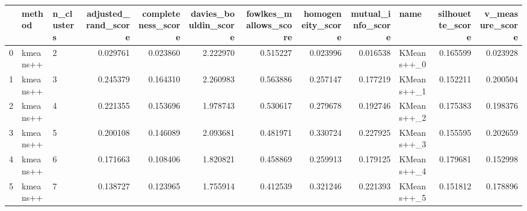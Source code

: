 \begin{tabular}{lllrrrrrrlrr}
\toprule
{} &    method & n\_clusters &  adjusted\_rand\_score &  completeness\_score &  davies\_bouldin\_score &  fowlkes\_mallows\_score &  homogeneity\_score &  mutual\_info\_score &        name &  silhouette\_score &  v\_measure\_score \\
\midrule
0 &  kmeans++ &          2 &             0.029761 &            0.023860 &              2.222970 &               0.515227 &           0.023996 &           0.016538 &  KMeans++\_0 &          0.165599 &         0.023928 \\
1 &  kmeans++ &          3 &             0.245379 &            0.164310 &              2.260983 &               0.563886 &           0.257147 &           0.177219 &  KMeans++\_1 &          0.152211 &         0.200504 \\
2 &  kmeans++ &          4 &             0.221355 &            0.153696 &              1.978743 &               0.530617 &           0.279678 &           0.192746 &  KMeans++\_2 &          0.175383 &         0.198376 \\
3 &  kmeans++ &          5 &             0.200108 &            0.146089 &              2.093681 &               0.481971 &           0.330724 &           0.227925 &  KMeans++\_3 &          0.155595 &         0.202659 \\
4 &  kmeans++ &          6 &             0.171663 &            0.108406 &              1.820821 &               0.458869 &           0.259913 &           0.179125 &  KMeans++\_4 &          0.179681 &         0.152998 \\
5 &  kmeans++ &          7 &             0.138727 &            0.123965 &              1.755914 &               0.412539 &           0.321246 &           0.221393 &  KMeans++\_5 &          0.151812 &         0.178896 \\
\bottomrule
\end{tabular}
